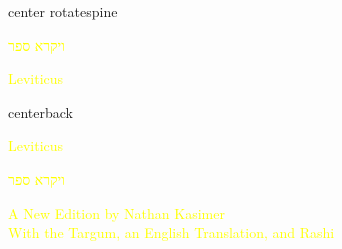 \documentclass[
coverheight=10in,
coverwidth=7in,
spinewidth=.75in,
bleedwidth=.125in,
12pt,
pagecolor=blue,
]{bookcover}
\newcommand{\hebtext}[1]{
\begin{hebrew}
	#1
\end{hebrew}
}
\begin{document}
	\begin{bookcover}
	\begin{bookcoverelement}{center rotate}{spine}
		\LARGE\textcolor{yellow}{\hebtext{ויקרא ספר} \space Leviticus }
	\end{bookcoverelement}

	\begin{bookcoverelement}{center}{back}
		\begin{Huge}
			\textcolor{yellow}{Leviticus}
			
			\textcolor{yellow}{\hebtext{ויקרא ספר}}
				
		\end{Huge}
		\vspace{2\baselineskip}
		\begin{large}
			\textcolor{yellow}{A New Edition by Nathan Kasimer\\With the Targum, an English Translation, and Rashi}
		\end{large}
	\end{bookcoverelement}
	\end{bookcover}
	
\end{document}
